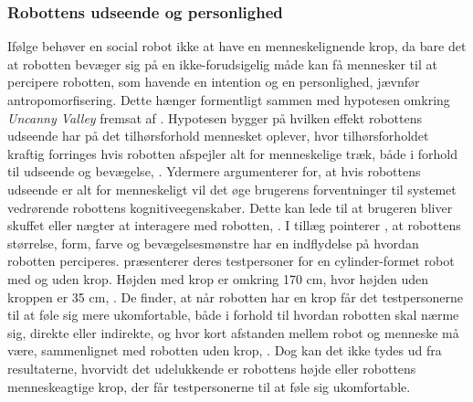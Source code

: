 \subsubsection*{Robottens udseende og personlighed}
\label{InteraktionSocialeRobotterParametreBevaegelsesmoenstreUdseende}
%
Ifølge \textcite[s. 226]{PDF:SocailAndCollaborative} behøver en social robot ikke at have en menneskelignende krop, da bare det at robotten bevæger sig på en ikke-forudsigelig måde kan få mennesker til at percipere robotten, som havende en intention og en personlighed, jævnfør antropomorfisering. Dette hænger formentligt sammen med hypotesen omkring \textit{Uncanny Valley} fremsat af \textcite{PDF:UncannyVally}. Hypotesen bygger på hvilken effekt robottens udseende har på det tilhørsforhold mennesket oplever, hvor tilhørsforholdet kraftig forringes hvis robotten afspejler alt for menneskelige træk, både i forhold til udseende og bevægelse, \textcite{PDF:UncannyVally}. Ydermere argumenterer \textcite[s. 610]{PDF:SpencerProject} for, at hvis robottens udseende er alt for menneskeligt vil det øge brugerens forventninger til systemet vedrørende robottens kognitiveegenskaber. Dette kan lede til at brugeren bliver skuffet eller nægter at interagere med robotten, \parencite[s. 610]{PDF:SpencerProject}. I tillæg pointerer \textcite[s. 226]{PDF:SocailAndCollaborative}, at robottens størrelse, form, farve og bevægelsesmønstre har en indflydelse på hvordan robotten perciperes. \blankline
%
\textcite[s. 189]{PDF:PsychologicalEffects} præsenterer deres testpersoner for en cylinder-formet robot med og uden krop. Højden med krop er omkring 170 cm, hvor højden uden kroppen er 35 cm, \parencite[s. 189]{PDF:PsychologicalEffects}. De finder, at når robotten har en krop får det testpersonerne til at føle sig mere ukomfortable, både i forhold til hvordan robotten skal nærme sig, direkte eller indirekte, og hvor kort afstanden mellem robot og menneske må være, sammenlignet med robotten uden krop, \parencite[s. 196]{PDF:PsychologicalEffects}. Dog kan det ikke tydes ud fra resultaterne, hvorvidt det udelukkende er robottens højde eller robottens menneskeagtige krop, der får testpersonerne til at føle sig ukomfortable.   

